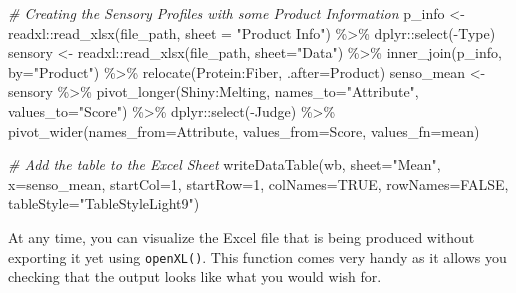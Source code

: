 \documentclass[
]{krantz}
\makeatletter
\newenvironment{Shaded}{\begin{snugshade}}{\end{snugshade}}
\newcommand{\AttributeTok}[1]{\textcolor[rgb]{0.61,0.61,0.61}{#1}}
\newcommand{\CommentTok}[1]{\textcolor[rgb]{0.37,0.37,0.37}{\textit{#1}}}
\newcommand{\ConstantTok}[1]{\textcolor[rgb]{0,0,0}{#1}}
\newcommand{\DecValTok}[1]{\textcolor[rgb]{0.06,0.06,0.06}{#1}}
\newcommand{\FunctionTok}[1]{\textcolor[rgb]{0,0,0}{#1}}
\newcommand{\NormalTok}[1]{#1}
\newcommand{\OtherTok}[1]{\textcolor[rgb]{0.37,0.37,0.37}{#1}}
\newcommand{\SpecialCharTok}[1]{\textcolor[rgb]{0,0,0}{#1}}
\newcommand{\StringTok}[1]{\textcolor[rgb]{0.5,0.5,0.5}{#1}}
\newenvironment{kframe}{%
\medskip{}
\setlength{\fboxsep}{.8em}
 \def\at@end@of@kframe{}%
 \ifinner\ifhmode%
  \def\at@end@of@kframe{\end{minipage}}%
  \begin{minipage}{\columnwidth}%
 \fi\fi%
 \def\FrameCommand##1{\hskip\@totalleftmargin \hskip-\fboxsep
 \colorbox{shadecolor}{##1}\hskip-\fboxsep
     \hskip-\linewidth \hskip-\@totalleftmargin \hskip\columnwidth}%
 \MakeFramed {\advance\hsize-\width
   \@totalleftmargin\z@ \linewidth\hsize
   \@setminipage}}%
 {\par\unskip\endMakeFramed%
 \at@end@of@kframe}
\renewenvironment{Shaded}{\begin{kframe}}{\end{kframe}}
\makeatother
\begin{document}
\begin{Shaded}
\begin{Highlighting}[]
\CommentTok{\# Creating the Sensory Profiles with some Product Information}
\NormalTok{p\_info }\OtherTok{\textless{}{-}}\NormalTok{ readxl}\SpecialCharTok{::}\FunctionTok{read\_xlsx}\NormalTok{(file\_path, }\AttributeTok{sheet =} \StringTok{"Product Info"}\NormalTok{) }\SpecialCharTok{\%\textgreater{}\%} 
\NormalTok{  dplyr}\SpecialCharTok{::}\FunctionTok{select}\NormalTok{(}\SpecialCharTok{{-}}\NormalTok{Type)}
\NormalTok{sensory }\OtherTok{\textless{}{-}}\NormalTok{ readxl}\SpecialCharTok{::}\FunctionTok{read\_xlsx}\NormalTok{(file\_path, }\AttributeTok{sheet=}\StringTok{"Data"}\NormalTok{) }\SpecialCharTok{\%\textgreater{}\%} 
  \FunctionTok{inner\_join}\NormalTok{(p\_info, }\AttributeTok{by=}\StringTok{"Product"}\NormalTok{) }\SpecialCharTok{\%\textgreater{}\%} 
  \FunctionTok{relocate}\NormalTok{(Protein}\SpecialCharTok{:}\NormalTok{Fiber, }\AttributeTok{.after=}\NormalTok{Product)}
\NormalTok{senso\_mean }\OtherTok{\textless{}{-}}\NormalTok{ sensory }\SpecialCharTok{\%\textgreater{}\%} 
  \FunctionTok{pivot\_longer}\NormalTok{(Shiny}\SpecialCharTok{:}\NormalTok{Melting, }
               \AttributeTok{names\_to=}\StringTok{"Attribute"}\NormalTok{, }\AttributeTok{values\_to=}\StringTok{"Score"}\NormalTok{) }\SpecialCharTok{\%\textgreater{}\%} 
\NormalTok{  dplyr}\SpecialCharTok{::}\FunctionTok{select}\NormalTok{(}\SpecialCharTok{{-}}\NormalTok{Judge) }\SpecialCharTok{\%\textgreater{}\%} 
  \FunctionTok{pivot\_wider}\NormalTok{(}\AttributeTok{names\_from=}\NormalTok{Attribute, }\AttributeTok{values\_from=}\NormalTok{Score, }
              \AttributeTok{values\_fn=}\NormalTok{mean)}

\CommentTok{\# Add the table to the Excel Sheet}
\FunctionTok{writeDataTable}\NormalTok{(wb, }\AttributeTok{sheet=}\StringTok{"Mean"}\NormalTok{, }\AttributeTok{x=}\NormalTok{senso\_mean, }
               \AttributeTok{startCol=}\DecValTok{1}\NormalTok{, }\AttributeTok{startRow=}\DecValTok{1}\NormalTok{, }
               \AttributeTok{colNames=}\ConstantTok{TRUE}\NormalTok{, }\AttributeTok{rowNames=}\ConstantTok{FALSE}\NormalTok{, }
               \AttributeTok{tableStyle=}\StringTok{"TableStyleLight9"}\NormalTok{)}
\end{Highlighting}
\end{Shaded}

At any time, you can visualize the Excel file that is being produced without exporting it yet using \texttt{openXL()}. This function comes very handy as it allows you checking that the output looks like what you would wish for.
\end{document}
